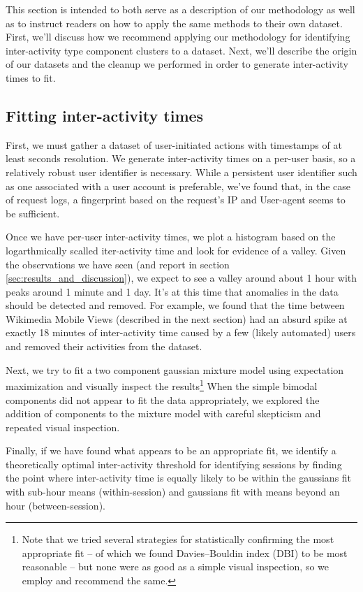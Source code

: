 This section is intended to both serve as a description of our methodology as well as to instruct readers on how to apply the same methods to their own dataset.  First, we'll discuss how we recommend applying our methodology for identifying inter-activity type component clusters to a dataset.  Next, we'll describe the origin of our datasets and the cleanup we performed in order to generate inter-activity times to fit.

\subsection{Fitting inter-activity times}
First, we must gather a dataset of user-initiated actions with timestamps of at least seconds resolution.  We generate inter-activity times on a per-user basis, so a relatively robust user identifier is necessary.  While a persistent user identifier such as one associated with a user account is preferable, we've found that, in the case of request logs, a fingerprint based on the request's IP and User-agent seems to be sufficient.

Once we have per-user inter-activity times, we plot a histogram based on the logarthmically scalled iter-activity time and look for evidence of a valley.  Given the observations we have seen (and report in section \ref{sec:results_and_discussion}), we expect to see a valley around about 1 hour with peaks around 1 minute and 1 day.  It's at this time that anomalies in the data should be detected and removed.  For example, we found that the time between Wikimedia Mobile Views (described in the next section) had an absurd spike at exactly 18 minutes of inter-activity time caused by a few (likely automated) users and removed their activities from the dataset.

Next, we try to fit a two component gaussian mixture model using expectation maximization\cite{benaglia2009mixtools} and visually inspect the results\footnote{Note that we tried several strategies for statistically confirming the most appropriate fit -- of which we found Davies--Bouldin index (DBI)\cite{davies1979cluster} to be most reasonable -- but none were as good as a simple visual inspection, so we employ and recommend the same.}  When the simple bimodal components did not appear to fit the data appropriately, we explored the addition of components to the mixture model with careful skepticism and repeated visual inspection.

Finally, if we have found what appears to be an appropriate fit, we identify a theoretically optimal inter-activity threshold for identifying sessions by finding the point where inter-activity time is equally likely to be within the gaussians fit with sub-hour means (within-session) and gaussians fit with means beyond an hour (between-session).

